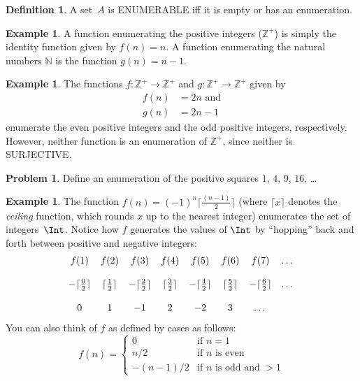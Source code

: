 \documentclass[10pt,a4paper]{article}
\newcommand*{\olup}[1]{\MakeUppercase{#1}}
\theoremstyle{plain}
\theoremstyle{definition}
\newtheorem{defn}[thm]{Definition}
\newtheorem{ex}[thm]{Example}
\newtheorem{prob}{Problem}[section]
\theoremstyle{remark}
\newcommand*{\ollabel}[1]{\label{#1}}
\providecommand{\Nat}{\ensuremath{\mathbb{N}}}
\providecommand{\PosInt}{\mathbb{Z}^{+}}
\begin{document}
\begin{defn}
  \ollabel{defn:enumerable}
  A set~$A$ is \olup{enumerable} iff it is empty or has an enumeration.
\end{defn}

\begin{ex}
A function enumerating the positive integers ($\PosInt$) is simply the
identity function given by $f(n) = n$. A function enumerating the
natural numbers $\Nat$ is the function $g(n) = n - 1$.
\end{ex}

\begin{ex}
The functions $f\colon \PosInt \to \PosInt$ and $g \colon \PosInt \to
\PosInt$ given by
\begin{align*}
f(n) & = 2n \text{ and}\\
g(n) & = 2n - 1
\end{align*}
enumerate the even positive integers and the odd positive integers,
respectively. However, neither function is an enumeration of
$\PosInt$, since neither is \olup{surjective}.
\end{ex}

\begin{prob}
Define an enumeration of the positive squares $1$, $4$, $9$, $16$, \dots
\end{prob}

\begin{ex}
The function $f(n) = (-1)^{n} \lceil \frac{(n-1)}{2}\rceil$ (where
$\lceil x \rceil$ denotes the \emph{ceiling} function, which rounds
$x$ up to the nearest integer) enumerates the set of
integers~$\Int$. Notice how $f$ generates the values of $\Int$ by
``hopping'' back and forth between positive and negative integers:
\[
\begin{array}{c c c c c c c c}
f(1) & f(2) & f(3) & f(4) & f(5) & f(6) & f(7) & \dots \\ \\
- \lceil \tfrac{0}{2} \rceil & \lceil \tfrac{1}{2}\rceil & - \lceil \tfrac{2}{2} \rceil & \lceil \tfrac{3}{2} \rceil & - \lceil \tfrac{4}{2} \rceil  & \lceil \tfrac{5}{2}
\rceil & - \lceil \tfrac{6}{2} \rceil & \dots \\ \\
0 & 1 & -1 & 2 & -2 & 3 & \dots
\end{array}
\]
You can also think of $f$ as defined by cases as follows:
\[
f(n) = \begin{cases}
  0 & \text{if $n = 1$}\\
  n/2 & \text{if $n$ is even}\\
  -(n-1)/2 & \text{if $n$ is odd and $>1$}
  \end{cases}
\]
\end{ex}
\end{document}
